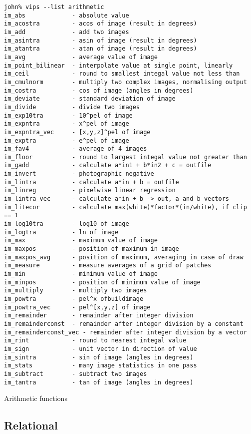 \begin{fig2}
\begin{verbatim}
john% vips --list arithmetic
im_abs             - absolute value
im_acostra         - acos of image (result in degrees)
im_add             - add two images
im_asintra         - asin of image (result in degrees)
im_atantra         - atan of image (result in degrees)
im_avg             - average value of image
im_point_bilinear  - interpolate value at single point, linearly
im_ceil            - round to smallest integal value not less than
im_cmulnorm        - multiply two complex images, normalising output
im_costra          - cos of image (angles in degrees)
im_deviate         - standard deviation of image
im_divide          - divide two images
im_exp10tra        - 10^pel of image
im_expntra         - x^pel of image
im_expntra_vec     - [x,y,z]^pel of image
im_exptra          - e^pel of image
im_fav4            - average of 4 images
im_floor           - round to largest integal value not greater than
im_gadd            - calculate a*in1 + b*in2 + c = outfile
im_invert          - photographic negative
im_lintra          - calculate a*in + b = outfile
im_linreg          - pixelwise linear regression
im_lintra_vec      - calculate a*in + b -> out, a and b vectors
im_litecor         - calculate max(white)*factor*(in/white), if clip == 1
im_log10tra        - log10 of image
im_logtra          - ln of image
im_max             - maximum value of image
im_maxpos          - position of maximum in image
im_maxpos_avg      - position of maximum, averaging in case of draw
im_measure         - measure averages of a grid of patches
im_min             - minimum value of image
im_minpos          - position of minimum value of image
im_multiply        - multiply two images
im_powtra          - pel^x ofbuildimage
im_powtra_vec      - pel^[x,y,z] of image
im_remainder       - remainder after integer division
im_remainderconst  - remainder after integer division by a constant
im_remainderconst_vec - remainder after integer division by a vector 
im_rint            - round to nearest integal value
im_sign            - unit vector in direction of value
im_sintra          - sin of image (angles in degrees)
im_stats           - many image statistics in one pass
im_subtract        - subtract two images
im_tantra          - tan of image (angles in degrees)
\end{verbatim}
\caption{Arithmetic functions}
\label{fg:arithmetic}
\end{fig2}

\subsection{Relational}

